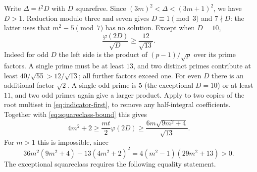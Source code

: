 \documentclass[11pt,a4paper]{article}
\theoremstyle{definition}
\begin{document}
Write $\Delta=t^2D$ with $D$ squarefree. Since
$(3m)^2<\Delta<(3m+1)^2$, we have $D>1$. Reduction modulo three and
seven gives $D\equiv1\pmod3$ and $7\nmid D$: the latter uses that
$m^2\equiv5\pmod7$ has no solution.
Except when $D=10$,
\begin{equation}
 \frac{\varphi(2D)}{\sqrt D}\ge\frac{12}{\sqrt{13}}.
 \label{eq:squareclass-bound}
\end{equation}
Indeed for odd $D$ the left side is the product of
$(p-1)/\sqrt p$ over its prime factors. A single prime must be at
least $13$, and two distinct primes contribute at least
$40/\sqrt{55}>12/\sqrt{13}$; all further factors exceed one.
For even $D$ there is an additional factor $\sqrt2$.
A single odd prime is $5$ (the exceptional $D=10$) or at least $11$,
and two odd primes again give a larger product.
Apply \cite[Theorem~1.3]{Larson} to two copies of the root multiset in
\eqref{eq:indicator-first}, to remove any half-integral coefficients.
Together with \eqref{eq:squareclass-bound} this gives
\[
 4m^2+2\ge\frac{mt}{2}\varphi(2D)
 \ge\frac{6m\sqrt{9m^2+4}}{\sqrt{13}}.
\]
For $m>1$ this is impossible, since
\[
 36m^2(9m^2+4)-13(4m^2+2)^2
 =4(m^2-1)(29m^2+13)>0.
\]
The exceptional squareclass requires the following equality statement.
\end{document}
